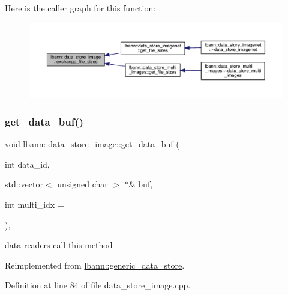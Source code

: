 Here is the caller graph for this function\+:\nopagebreak
\begin{figure}[H]
\begin{center}
\leavevmode
\includegraphics[width=350pt]{classlbann_1_1data__store__image_a477529f2ba3f86598bbd409d3c2b6901_icgraph}
\end{center}
\end{figure}
\mbox{\label{classlbann_1_1data__store__image_aa9e47fb3cad58dda4eaddcccc9bfa523}} 
\subsubsection{\texorpdfstring{get\+\_\+data\+\_\+buf()}{get\_data\_buf()}}
{\footnotesize\ttfamily void lbann\+::data\+\_\+store\+\_\+image\+::get\+\_\+data\+\_\+buf (\begin{DoxyParamCaption}\item[{int}]{data\+\_\+id,  }\item[{std\+::vector$<$ unsigned char $>$ $\ast$\&}]{buf,  }\item[{int}]{multi\+\_\+idx = {} }\end{DoxyParamCaption})\hspace{0.3cm}{\ttfamily [override]}, {\ttfamily [virtual]}}



data readers call this method 



Reimplemented from \hyperlink{classlbann_1_1generic__data__store_a2abb3d0327b528d36e23fcef9b937798}{lbann\+::generic\+\_\+data\+\_\+store}.



Definition at line 84 of file data\+\_\+store\+\_\+image.\+cpp.


